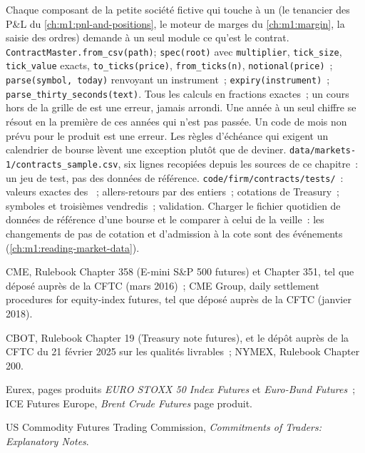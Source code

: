 \begin{build}
 Chaque composant de la petite société fictive qui touche
à un  (le tenancier des P\&L du \cref{ch:m1:pnl-and-positions}, le moteur de marges
du \cref{ch:m1:margin}, la saisie des ordres) demande à un seul module ce qu'est le contrat.
 \texttt{ContractMaster.from\_csv(path)};
\texttt{spec(root)} avec \texttt{multiplier}, \texttt{tick\_size},
\texttt{tick\_value} exacts, \texttt{to\_ticks(price)}, \texttt{from\_ticks(n)},
\texttt{notional(price)}~; \texttt{parse(symbol, today)} renvoyant un
instrument~; \texttt{expiry(instrument)}~;
\texttt{parse\_thirty\_seconds(text)}.
 Tous les calculs en fractions exactes~; un cours hors de la grille de  est une
erreur, jamais arrondi. Une année à un seul chiffre se résout en la première de ces années
qui n'est pas passée. Un code de mois non prévu pour le produit est une
erreur. Les règles d'échéance qui exigent un calendrier de bourse lèvent une exception plutôt que de deviner.
 \texttt{data/markets-1/contracts\_sample.csv}, six lignes
recopiées depuis les sources de ce chapitre~: un jeu de test, pas des données de référence.
 \texttt{code/firm/contracts/tests/}~: valeurs exactes des
~; allers-retours par des  entiers~; cotations de Treasury~; symboles et
troisièmes vendredis~; validation.
 Charger le fichier quotidien de données de référence d'une bourse et
le comparer à celui de la veille~: les changements de pas de cotation et d'admission à la cote sont des événements
(\cref{ch:m1:reading-market-data}).
\end{build}

\begin{omsources}
\item CME, Rulebook Chapter 358 (E-mini S\&P 500 futures) et Chapter 351,
tel que déposé auprès de la CFTC (mars 2016)~; CME Group, daily settlement procedures
for equity-index futures, tel que déposé auprès de la CFTC (janvier 2018).
\item CBOT, Rulebook Chapter 19 (Treasury note futures), et le dépôt auprès de la CFTC
du 21 février 2025 sur les qualités livrables~; NYMEX, Rulebook Chapter 200.
\item Eurex, pages produits \emph{EURO STOXX 50 Index Futures} et
\emph{Euro-Bund Futures}~; ICE Futures Europe, \emph{Brent Crude Futures}
page produit.
\item US Commodity Futures Trading Commission, \emph{Commitments of Traders:
Explanatory Notes}.
\end{omsources}

